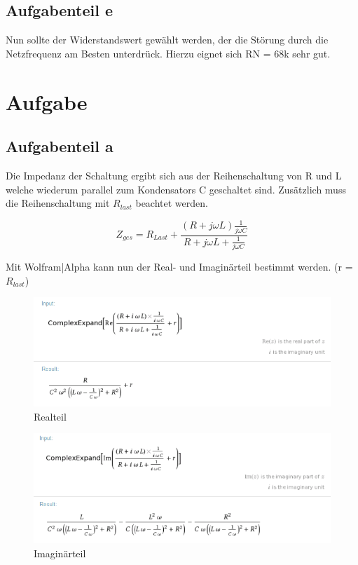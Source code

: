 \documentclass[%
  a4paper, %
  12pt, %
   article, %
  titlepage
]{scrartcl}
\begin{document}
\subsection{Aufgabenteil e}

Nun sollte der Widerstandswert gewählt werden, der die Störung durch die Netzfrequenz am Besten unterdrück. 
Hierzu eignet sich RN = 68k sehr gut.

\clearpage

\section{Aufgabe}
\subsection{Aufgabenteil a}

Die Impedanz der Schaltung ergibt sich aus der Reihenschaltung von R und L welche wiederum parallel zum Kondensators
C geschaltet sind. Zusätzlich muss die Reihenschaltung mit $R_{last}$ beachtet werden.

\begin{equation}
Z_{ges}=R_{Last}+\frac{(R+j\omega L)\frac{1}{j\omega C}}{R+j\omega L+\frac{1}{j\omega C}}
\end{equation}

Mit Wolfram|Alpha  kann nun der Real- und Imaginärteil bestimmt werden. (r = $R_{last}$)

\begin{figure}[h]
\includegraphics[width=\textwidth]{wolfram1.png}
\caption{Realteil}
\label{fig3}
\end{figure}

\begin{figure}[h]
\includegraphics[width=\textwidth]{wolfram2.png}
\caption{Imaginärteil}
\label{fig4}
\end{figure}
\end{document}
